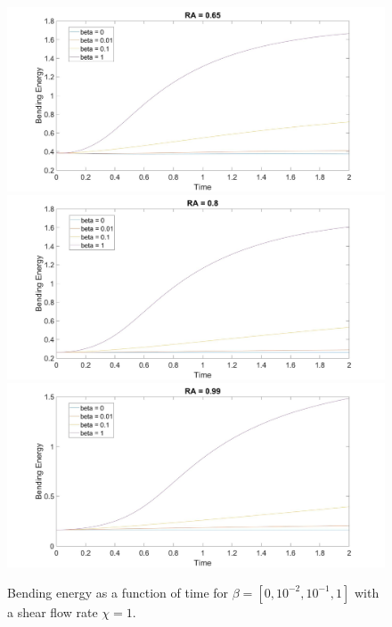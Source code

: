 \documentclass[aps,prl,showpacs]{revtex4}
\begin{document}
 \begin{figure}
 	\centering
 	\includegraphics[width=.9\textwidth]{figures/BE7.jpg}
 	\includegraphics[width=.9\textwidth]{figures/BE8.jpg}
 	\includegraphics[width=.9\textwidth]{figures/BE9.jpg}
 	\caption{Bending energy as a function of time for $\beta = [0, 10^{-2},10^{-1}, 1]$ with a shear flow rate $\chi = 1$.}
 	\label{Shear0}
 \end{figure}
 
\end{document}
